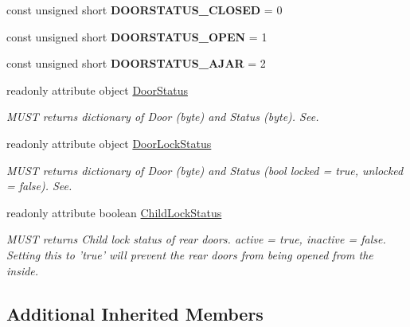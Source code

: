 \begin{DoxyCompactItemize}
\item 
\hypertarget{interfaceVehicle_1_1DoorStatus_a35f042851b4c66c3913c628bc8aa64e6}{const unsigned short {\bfseries D\-O\-O\-R\-S\-T\-A\-T\-U\-S\-\_\-\-C\-L\-O\-S\-E\-D} = 0}\label{interfaceVehicle_1_1DoorStatus_a35f042851b4c66c3913c628bc8aa64e6}

\item 
\hypertarget{interfaceVehicle_1_1DoorStatus_a28158e8e8ccc3ace28b55c7a3193e598}{const unsigned short {\bfseries D\-O\-O\-R\-S\-T\-A\-T\-U\-S\-\_\-\-O\-P\-E\-N} = 1}\label{interfaceVehicle_1_1DoorStatus_a28158e8e8ccc3ace28b55c7a3193e598}

\item 
\hypertarget{interfaceVehicle_1_1DoorStatus_a3f76e43df293682cbecf8b8a579e4140}{const unsigned short {\bfseries D\-O\-O\-R\-S\-T\-A\-T\-U\-S\-\_\-\-A\-J\-A\-R} = 2}\label{interfaceVehicle_1_1DoorStatus_a3f76e43df293682cbecf8b8a579e4140}

\item 
readonly attribute object \hyperlink{interfaceVehicle_1_1DoorStatus_ae777cde0e6de41279666e4b79bf5b9b0}{Door\-Status}
\begin{DoxyCompactList}\small\item\em M\-U\-S\-T returns dictionary of Door (byte) and Status (byte). See. \end{DoxyCompactList}\item 
readonly attribute object \hyperlink{interfaceVehicle_1_1DoorStatus_a8c6bf40e9ad855cdf5c180c5fb6cfc7f}{Door\-Lock\-Status}
\begin{DoxyCompactList}\small\item\em M\-U\-S\-T returns dictionary of Door (byte) and Status (bool locked = true, unlocked = false). See. \end{DoxyCompactList}\item 
readonly attribute boolean \hyperlink{interfaceVehicle_1_1DoorStatus_a09d583fc4050c982fb4e5105367f5c54}{Child\-Lock\-Status}
\begin{DoxyCompactList}\small\item\em M\-U\-S\-T returns Child lock status of rear doors. active = true, inactive = false. Setting this to 'true' will prevent the rear doors from being opened from the inside. \end{DoxyCompactList}\end{DoxyCompactItemize}
\subsection*{Additional Inherited Members}


